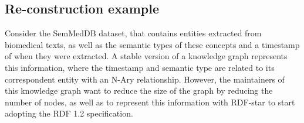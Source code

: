 \begin{table}[t]
    \centering
    \caption[Summary results of the representation impact on KG consumption scenarios]{Summary of the fitness for each representation evaluated in the studied scenarios, where \checkmark means suitable, $\backsim$ is acceptable, X is avoidable and * indicates that the value is not tested but equivalent to Qualifiers.}
    \label{tab:chp6-1_kgconsumption_summary}
\end{table}


\subsection{Re-construction example}


Consider the SemMedDB dataset, that contains entities extracted from biomedical texts, as well as the semantic types of these concepts and a timestamp of when they were extracted. A stable version of a knowledge graph represents this information, where the timestamp and semantic type are related to its correspondent entity with an N-Ary relationship. However, the maintainers of this knowledge graph want to reduce the size of the graph by reducing the number of nodes, as well as to represent this information with RDF-star to start adopting the RDF 1.2 specification.

